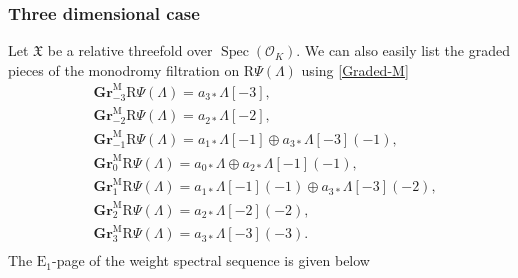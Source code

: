 \documentclass[10pt]{amsart}
\numberwithin{equation}{section}
\theoremstyle{plain}
\numberwithin{equation}{section}
\theoremstyle{definition}
\theoremstyle{remark}
\DeclareMathOperator{\Spec}{Spec}
\def\calO{\mathcal{O}}
\def\rmE{\mathrm{E}}
\def\rmM{\mathrm{M}}
\def\rmR{\mathrm{R}}
\newcommand{\Gr}{\mathbf{Gr}}
\begin{document}
\subsubsection{Three dimensional case} Let $\mathfrak{X}$ be a relative threefold over $\Spec(\calO_{K})$. We can also easily list the graded pieces of the monodromy filtration on $\rmR\Psi(\Lambda)$ using \ref{Graded-M}
\begin{equation*}
\begin{aligned}
&\Gr^{\rmM}_{-3}\rmR\Psi(\Lambda)=a_{3*}\Lambda[-3], \\
&\Gr^{\rmM}_{-2}\rmR\Psi(\Lambda)=a_{2*}\Lambda[-2], \\
&\Gr^{\rmM}_{-1}\rmR\Psi(\Lambda)=a_{1*}\Lambda[-1]\oplus a_{3*}\Lambda[-3](-1), \\
&\Gr^{\rmM}_{0}\rmR\Psi(\Lambda)=a_{0*}\Lambda\oplus a_{2*}\Lambda[-1](-1),  \\
&\Gr^{\rmM}_{1}\rmR\Psi(\Lambda)=a_{1*}\Lambda[-1](-1)\oplus a_{3*}\Lambda[-3](-2),\\
&\Gr^{\rmM}_{2}\rmR\Psi(\Lambda)=a_{2*}\Lambda[-2](-2), \\
&\Gr^{\rmM}_{3}\rmR\Psi(\Lambda)=a_{3*}\Lambda[-3](-3).\\
\end{aligned}
\end{equation*}
The $\rmE_{1}$-page of the weight spectral sequence is given below
\end{document}
